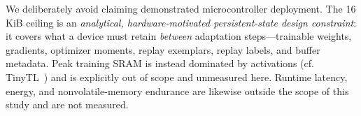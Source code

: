 We deliberately avoid claiming demonstrated microcontroller deployment. The
16\,KiB ceiling is an \emph{analytical, hardware-motivated persistent-state
design constraint}: it covers what a device must retain \emph{between}
adaptation steps---trainable weights, gradients, optimizer moments, replay
exemplars, replay labels, and buffer metadata. Peak training SRAM is instead
dominated by activations (cf. TinyTL~\cite{cai2020tinytl}) and is explicitly
out of scope and unmeasured here. Runtime latency, energy, and
nonvolatile-memory endurance are likewise outside the scope of this study and
are not measured.
